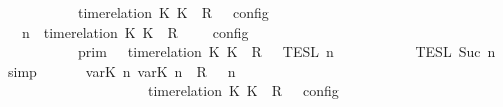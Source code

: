 \begin{isabellebody}
\ \ \ \ \ \ \ \ {\isasymturnstile}\ {\isasymPsi}\ {\isasymtriangleright}\ {\isacharparenleft}{\isacharparenleft}time{\isacharminus}relation\ {\isasymlfloor}K\ K\ {\isasymin}\ R{\isacharparenright}\ {\isacharhash}\ {\isasymPhi}{\isacharparenright}\ {\isasymrbrakk}\isactrlsub c\isactrlsub o\isactrlsub n\isactrlsub f\isactrlsub i\isactrlsub g{\isacartoucheclose}\isanewline
%
\isadelimproof
%
\endisadelimproof
%
\isatagproof
{}\isamarkupfalse%
\ {\isacharminus}\isanewline
\ \ \isamarkupfalse%
\ {\isacartoucheopen}{\isasymlbrakk}\ {\isasymGamma}{\isacharcomma}\ n\ {\isasymturnstile}\ {\isacharparenleft}time{\isacharminus}relation\ {\isasymlfloor}K\ K\ {\isasymin}\ R{\isacharparenright}\ {\isacharhash}\ {\isasymPsi}\ {\isasymtriangleright}\ {\isasymPhi}\ {\isasymrbrakk}\isactrlsub c\isactrlsub o\isactrlsub n\isactrlsub f\isactrlsub i\isactrlsub g\isanewline
\ \ \ \ \ \ \ \ {\isacharequal}\ {\isasymlbrakk}{\isasymlbrakk}\ {\isasymGamma}\ {\isasymrbrakk}{\isasymrbrakk}\isactrlsub p\isactrlsub r\isactrlsub i\isactrlsub m\ {\isasyminter}\ {\isasymlbrakk}{\isasymlbrakk}\ {\isacharparenleft}time{\isacharminus}relation\ {\isasymlfloor}K\ K\ {\isasymin}\ R{\isacharparenright}\ {\isacharhash}\ {\isasymPsi}\ {\isasymrbrakk}{\isasymrbrakk}\isactrlsub T\isactrlsub E\isactrlsub S\isactrlsub L\isactrlbsup {\isasymge}\ n\isactrlesup \isanewline
\ \ \ \ \ \ \ \ {\isasyminter}\ {\isasymlbrakk}{\isasymlbrakk}\ {\isasymPhi}\ {\isasymrbrakk}{\isasymrbrakk}\isactrlsub T\isactrlsub E\isactrlsub S\isactrlsub L\isactrlbsup {\isasymge}\ Suc\ n\isactrlesup {\isacartoucheclose}\ \isamarkupfalse%
\ simp\isanewline
\ \ \isamarkupfalse%
\ \isamarkupfalse%
\ {\isacartoucheopen}{\isasymlbrakk}\ {\isacharparenleft}{\isacharparenleft}{\isasymlfloor}{\isasymtau}\isactrlsub v\isactrlsub a\isactrlsub r{\isacharparenleft}K\ n{\isacharparenright}{\isacharcomma}\ {\isasymtau}\isactrlsub v\isactrlsub a\isactrlsub r{\isacharparenleft}K\ n{\isacharparenright}{\isasymrfloor}\ {\isasymin}\ R{\isacharparenright}\ {\isacharhash}\ {\isasymGamma}{\isacharparenright}{\isacharcomma}\ n\isanewline
\ \ \ \ \ \ \ \ \ \ \ \ \ \ \ \ \ \ {\isasymturnstile}\ {\isasymPsi}\ {\isasymtriangleright}\ {\isacharparenleft}{\isacharparenleft}time{\isacharminus}relation\ {\isasymlfloor}K\ K\ {\isasymin}\ R{\isacharparenright}\ {\isacharhash}\ {\isasymPhi}{\isacharparenright}\ {\isasymrbrakk}\isactrlsub c\isactrlsub o\isactrlsub n\isactrlsub f\isactrlsub i\isactrlsub g\isanewline

\end{isabellebody}
